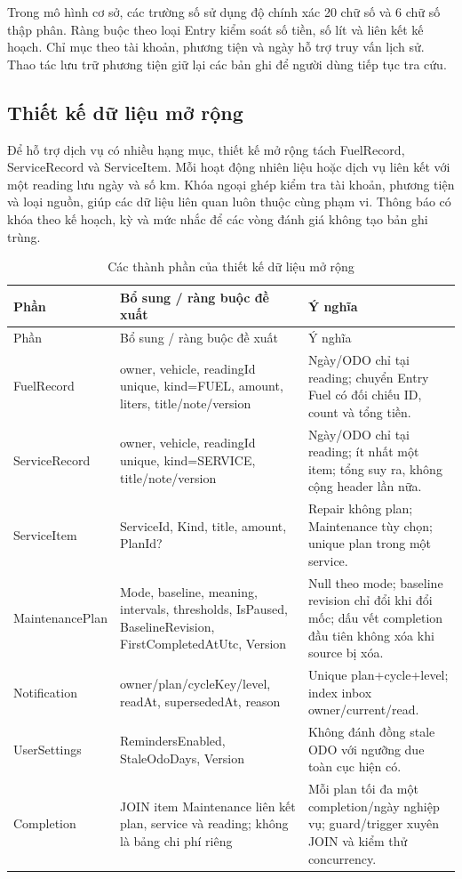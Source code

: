 Trong mô hình cơ sở, các trường số sử dụng độ chính xác 20 chữ số và 6 chữ số thập phân. Ràng buộc theo loại Entry kiểm soát số tiền, số lít và liên kết kế hoạch. Chỉ mục theo tài khoản, phương tiện và ngày hỗ trợ truy vấn lịch sử. Thao tác lưu trữ phương tiện giữ lại các bản ghi để người dùng tiếp tục tra cứu.

\subsection{Thiết kế dữ liệu mở rộng}
Để hỗ trợ dịch vụ có nhiều hạng mục, thiết kế mở rộng tách FuelRecord, ServiceRecord và ServiceItem. Mỗi hoạt động nhiên liệu hoặc dịch vụ liên kết với một reading lưu ngày và số km. Khóa ngoại ghép kiểm tra tài khoản, phương tiện và loại nguồn, giúp các dữ liệu liên quan luôn thuộc cùng phạm vi. Thông báo có khóa theo kế hoạch, kỳ và mức nhắc để các vòng đánh giá không tạo bản ghi trùng.

\begin{smalltable}\begin{longtable}{L{3cm}L{6.5cm}L{5cm}}
\caption{Các thành phần của thiết kế dữ liệu mở rộng}\\\toprule Phần & Bổ sung / ràng buộc đề xuất & Ý nghĩa\\\midrule\endfirsthead
\toprule Phần & Bổ sung / ràng buộc đề xuất & Ý nghĩa\\\midrule\endhead
FuelRecord & owner, vehicle, readingId unique, kind=FUEL, amount, liters, title/note/version & Ngày/ODO chỉ tại reading; chuyển Entry Fuel có đối chiếu ID, count và tổng tiền.\\
ServiceRecord & owner, vehicle, readingId unique, kind=SERVICE, title/note/version & Ngày/ODO chỉ tại reading; ít nhất một item; tổng suy ra, không cộng header lần nữa.\\
ServiceItem & ServiceId, Kind, title, amount, PlanId? & Repair không plan; Maintenance tùy chọn; unique plan trong một service.\\
MaintenancePlan & Mode, baseline, meaning, intervals, thresholds, IsPaused, BaselineRevision, FirstCompletedAtUtc, Version & Null theo mode; baseline revision chỉ đổi khi đổi mốc; dấu vết completion đầu tiên không xóa khi source bị xóa.\\
Notification & owner/plan/cycleKey/level, readAt, supersededAt, reason & Unique plan+cycle+level; index inbox owner/current/read.\\
UserSettings & RemindersEnabled, StaleOdoDays, Version & Không đánh đồng stale ODO với ngưỡng due toàn cục hiện có.\\
Completion & JOIN item Maintenance liên kết plan, service và reading; không là bảng chi phí riêng & Mỗi plan tối đa một completion/ngày nghiệp vụ; guard/trigger xuyên JOIN và kiểm thử concurrency.\\\bottomrule
\end{longtable}\end{smalltable}


